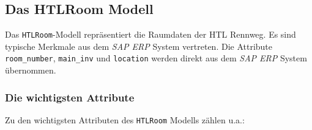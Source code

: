 \hypertarget{das-htlroom-modell}{%
\subsection{Das HTLRoom Modell}\label{das-htlroom-modell}}

Das \texttt{HTLRoom}-Modell repräsentiert die Raumdaten der HTL Rennweg.
Es sind typische Merkmale aus dem \emph{SAP ERP}
System vertreten. Die Attribute \texttt{room\_number},
\texttt{main\_inv} und \texttt{location} werden direkt aus dem
\emph{SAP ERP}
System übernommen.

\hypertarget{die-wichtigsten-attribute-1}{%
\subsubsection{Die wichtigsten
Attribute}\label{die-wichtigsten-attribute-1}}

Zu den wichtigsten Attributen des \texttt{HTLRoom} Modells zählen u.a.:

